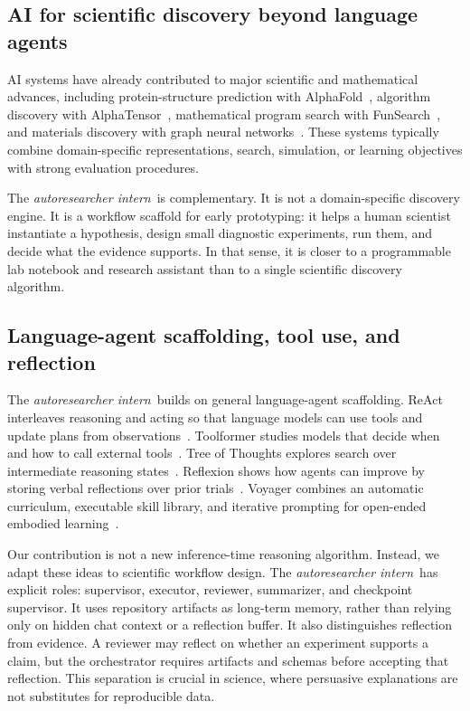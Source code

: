 \documentclass{article}
\newcommand{\intern}{\emph{autoresearcher intern}}
\begin{document}
\subsection{AI for scientific discovery beyond language agents}

AI systems have already contributed to major scientific and mathematical advances, including protein-structure prediction with AlphaFold~\citep{jumper2021alphafold}, algorithm discovery with AlphaTensor~\citep{fawzi2022alphatensor}, mathematical program search with FunSearch~\citep{romeraparedes2024funsearch}, and materials discovery with graph neural networks~\citep{merchant2023gnome}. These systems typically combine domain-specific representations, search, simulation, or learning objectives with strong evaluation procedures.

The \intern\ is complementary. It is not a domain-specific discovery engine. It is a workflow scaffold for early prototyping: it helps a human scientist instantiate a hypothesis, design small diagnostic experiments, run them, and decide what the evidence supports. In that sense, it is closer to a programmable lab notebook and research assistant than to a single scientific discovery algorithm.

\subsection{Language-agent scaffolding, tool use, and reflection}

The \intern\ builds on general language-agent scaffolding. ReAct interleaves reasoning and acting so that language models can use tools and update plans from observations~\citep{yao2022react}. Toolformer studies models that decide when and how to call external tools~\citep{schick2023toolformer}. Tree of Thoughts explores search over intermediate reasoning states~\citep{yao2023tree}. Reflexion shows how agents can improve by storing verbal reflections over prior trials~\citep{shinn2023reflexion}. Voyager combines an automatic curriculum, executable skill library, and iterative prompting for open-ended embodied learning~\citep{wang2023voyager}.

Our contribution is not a new inference-time reasoning algorithm. Instead, we adapt these ideas to scientific workflow design. The \intern\ has explicit roles: supervisor, executor, reviewer, summarizer, and checkpoint supervisor. It uses repository artifacts as long-term memory, rather than relying only on hidden chat context or a reflection buffer. It also distinguishes reflection from evidence. A reviewer may reflect on whether an experiment supports a claim, but the orchestrator requires artifacts and schemas before accepting that reflection. This separation is crucial in science, where persuasive explanations are not substitutes for reproducible data.
\end{document}
